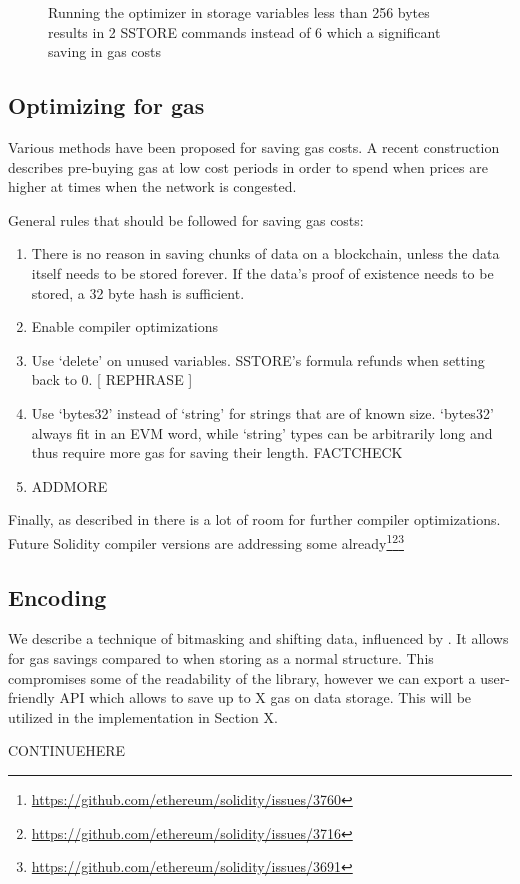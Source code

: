 \begin{figure}[H]
    \begin{subfigure}[b]{\textwidth}
        \centering
        
    \end{subfigure}

    \begin{subfigure}[b]{\textwidth}
        \centering
        
    \end{subfigure}
    \label{struct_optimization}
    \caption{Running the optimizer in storage variables less than 256 bytes results in 2 SSTORE commands instead of 6 which a significant saving in gas costs}
\end{figure}

\subsection{Optimizing for gas}
Various methods have been proposed for saving gas costs. A recent construction\cite{gastoken} describes pre-buying gas at low cost periods in order to spend when prices are higher at times when the network is congested. 

General rules that should be followed for saving gas costs:
\begin{enumerate}
    \item There is no reason in saving chunks of data on a blockchain, unless the data itself needs to be stored forever. If the data's proof of existence needs to be stored, a 32 byte hash is sufficient.
    \item Enable compiler optimizations
    \item Use `delete' on unused variables. SSTORE's formula refunds when setting back to 0. [ REPHRASE ]
    \item Use `bytes32' instead of `string' for strings that are of known size. `bytes32' always fit in an EVM word, while `string' types can be arbitrarily long and thus require more gas for saving their length. FACTCHECK
    \item ADDMORE
\end{enumerate}

Finally, as described in \cite{DBLP:journals/corr/ChenLLZ17} there is a lot of room for further compiler optimizations. Future Solidity compiler versions are addressing some already\footnote{\url{https://github.com/ethereum/solidity/issues/3760}}\footnote{\url{https://github.com/ethereum/solidity/issues/3716}}\footnote{\url{https://github.com/ethereum/solidity/issues/3691}}

\subsection{Encoding}
We describe a technique of bitmasking and shifting data,  influenced by \cite{virtualstruct}. It allows for gas savings compared to when storing as a normal structure. This compromises some of the readability of the library, however we can export a user-friendly API which allows to save up to X gas on data storage. This will be utilized in the implementation in Section X. 

CONTINUEHERE